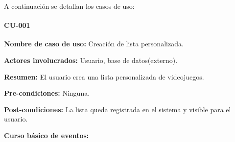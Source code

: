 A continuación se detallan los casos de uso: 
\paragraph{CU-001}
\begin{description}
    \item \textbf{Nombre de caso de uso:} Creación de lista personalizada.
    \item \textbf{Actores involucrados:} Usuario, base de datos(externo).
    \item \textbf{Resumen:} El usuario crea una lista personalizada de videojuegos.
    \item \textbf{Pre-condiciones:} Ninguna.
    \item \textbf{Post-condiciones:} La lista queda registrada en el sistema y visible para el usuario.
    \item \textbf{Curso básico de eventos:} 
    

\end{description}
